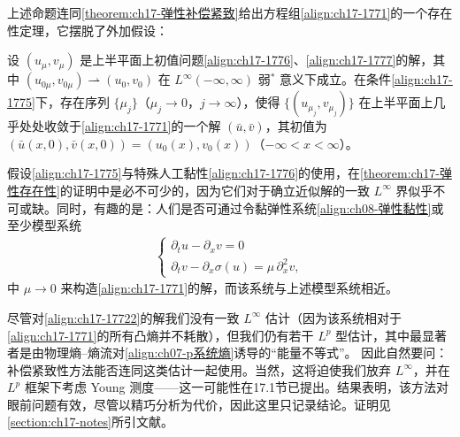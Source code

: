 \documentclass[../../main.tex]{subfiles}
\begin{document}
上述命题连同\cref{theorem:ch17-弹性补偿紧致}给出方程组\eqref{align:ch17-1771}的一个存在性定理，它摆脱了外加假设：

\begin{theorem}[等熵弹性的存在性]\label{theorem:ch17-弹性存在性}
设 $(u_\mu,v_\mu)$ 是上半平面上初值问题\eqref{align:ch17-1776}、\eqref{align:ch17-1777}的解，其中 $(u_{0\mu},v_{0\mu})\rightharpoonup(u_0,v_0)$ 在 $L^\infty(-\infty,\infty)$ 弱$^*$ 意义下成立。在条件\eqref{align:ch17-1775}下，存在序列 $\{\mu_j\}$（$\mu_j\to0$，$j\to\infty$），使得 $\{(u_{\mu_j},v_{\mu_j})\}$ 在上半平面上几乎处处收敛于\eqref{align:ch17-1771}的一个解 $(\bar u,\bar v)$，其初值为 $(\bar u(x,0),\bar v(x,0))=(u_0(x),v_0(x))$（$-\infty<x<\infty$）。
\end{theorem}

假设\eqref{align:ch17-1775}与特殊人工黏性\eqref{align:ch17-1776}的使用，在\cref{theorem:ch17-弹性存在性}的证明中是必不可少的，因为它们对于确立近似解的一致 $L^\infty$ 界似乎不可或缺。同时，有趣的是：人们是否可通过令黏弹性系统\eqref{align:ch08-弹性黏性}或至少模型系统
\begin{align}
\begin{cases}
\partial_t u-\partial_x v=0\\
\partial_t v-\partial_x\sigma(u)=\mu\,\partial_x^2v,
\end{cases}
\label{align:ch17-17722}
\end{align}
中 $\mu\to0$ 来构造\eqref{align:ch17-1771}的解，而该系统与上述模型系统相近。

尽管对\eqref{align:ch17-17722}的解我们没有一致 $L^\infty$ 估计（因为该系统相对于\eqref{align:ch17-1771}的所有凸熵并不耗散），但我们仍有若干 $L^p$ 型估计，其中最显著者是由物理熵--熵流对\eqref{align:ch07-p系统熵}诱导的“能量不等式”。
因此自然要问：补偿紧致性方法能否连同这类估计一起使用。当然，这将迫使我们放弃 $L^\infty$，并在 $L^p$ 框架下考虑 Young 测度——这一可能性在17.1节已提出。结果表明，该方法对眼前问题有效，尽管以精巧分析为代价，因此这里只记录结论。证明见\cref{section:ch17-notes}所引文献。
\end{document}
